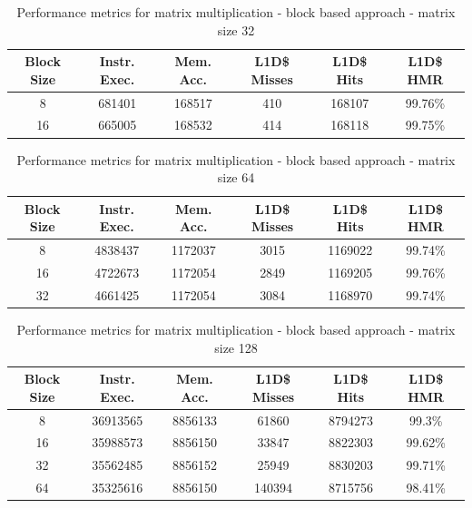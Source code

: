 \begin{center}
\begin{table}[!htbp]
\centering
\begin{tabular}{|c|c|c|c|c|c|}
\hline
\textbf{Block Size} & \textbf{Instr. Exec.} & \textbf{Mem. Acc.} & \textbf{L1D\$ Misses} & \textbf{L1D\$ Hits} & \textbf{L1D\$ HMR} \\ \hline
8 & 681401 & 168517 & 410 & 168107 & 99.76\% \\ \hline
16 & 665005 & 168532 & 414 & 168118 & 99.75\% \\ \hline
\end{tabular}
\caption{Performance metrics for matrix multiplication - block based approach - matrix size 32}
\label{tab:performance_metrics_32}
\end{table}
\end{center}

\begin{center}
\begin{table}[!htbp]
\centering
\begin{tabular}{|c|c|c|c|c|c|}
\hline
\textbf{Block Size} & \textbf{Instr. Exec.} & \textbf{Mem. Acc.} & \textbf{L1D\$ Misses} & \textbf{L1D\$ Hits} & \textbf{L1D\$ HMR} \\ \hline
8 & 4838437 & 1172037 & 3015 & 1169022 & 99.74\% \\ \hline
16 & 4722673 & 1172054 & 2849 & 1169205 & 99.76\% \\ \hline
32 & 4661425 & 1172054 & 3084 & 1168970 & 99.74\% \\ \hline
\end{tabular}
\caption{Performance metrics for matrix multiplication - block based approach - matrix size 64}
\label{tab:performance_metrics_64}
\end{table}
\end{center}

\begin{center}
\begin{table}[!htbp]
\centering
\begin{tabular}{|c|c|c|c|c|c|}
\hline
\textbf{Block Size} & \textbf{Instr. Exec.} & \textbf{Mem. Acc.} & \textbf{L1D\$ Misses} & \textbf{L1D\$ Hits} & \textbf{L1D\$ HMR} \\ \hline
8 & 36913565 & 8856133 & 61860 & 8794273 & 99.3\% \\ \hline
16 & 35988573 & 8856150 & 33847 & 8822303 & 99.62\% \\ \hline
32 & 35562485 & 8856152 & 25949 & 8830203 & 99.71\% \\ \hline
64 & 35325616 & 8856150 & 140394 & 8715756 & 98.41\% \\ \hline
\end{tabular}
\caption{Performance metrics for matrix multiplication - block based approach - matrix size 128}
\label{tab:performance_metrics_128}
\end{table}
\end{center}

